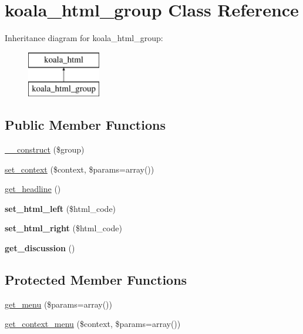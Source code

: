 \hypertarget{classkoala__html__group}{
\section{koala\_\-html\_\-group Class Reference}
\label{classkoala__html__group}
}
Inheritance diagram for koala\_\-html\_\-group:\begin{figure}[H]
\begin{center}
\leavevmode
\includegraphics[height=2.000000cm]{classkoala__html__group}
\end{center}
\end{figure}
\subsection*{Public Member Functions}
\begin{DoxyCompactItemize}
\item 
\hyperlink{classkoala__html__group_a78f26bf1e260fa53319cf5d2a73b3191}{\_\-\_\-construct} (\$group)
\item 
\hyperlink{classkoala__html__group_a8ab97ca81a6757cf2940d07612c13862}{set\_\-context} (\$context, \$params=array())
\item 
\hyperlink{classkoala__html__group_a9e5d764fa4505596e654ada84f738f3d}{get\_\-headline} ()
\item 
\hypertarget{classkoala__html__group_a7674e8933d0e2f69cd4f99e3921db9ac}{
{\bfseries set\_\-html\_\-left} (\$html\_\-code)}
\label{classkoala__html__group_a7674e8933d0e2f69cd4f99e3921db9ac}

\item 
\hypertarget{classkoala__html__group_aba145870b4b3f684b4222dae6066babc}{
{\bfseries set\_\-html\_\-right} (\$html\_\-code)}
\label{classkoala__html__group_aba145870b4b3f684b4222dae6066babc}

\item 
\hypertarget{classkoala__html__group_a99957e9b831a7b51614b2724e95a3505}{
{\bfseries get\_\-discussion} ()}
\label{classkoala__html__group_a99957e9b831a7b51614b2724e95a3505}

\end{DoxyCompactItemize}
\subsection*{Protected Member Functions}
\begin{DoxyCompactItemize}
\item 
\hyperlink{classkoala__html__group_a1d057ea054f7f309c348c81935ad25ef}{get\_\-menu} (\$params=array())
\item 
\hyperlink{classkoala__html__group_a0cd52bc5d4ee7eba6026af9d533549c5}{get\_\-context\_\-menu} (\$context, \$params=array())
\end{DoxyCompactItemize}


